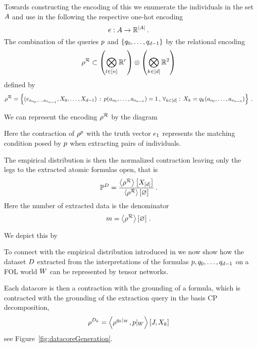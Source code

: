 Towards constructing the encoding of this we enumerate the individuals in the set $A$ and use in the following the respective one-hot encoding 
	\[ e : A \rightarrow \mathbb{R}^{\left|A\right|} \, . \]
The combination of the queries $p$ and $\{q_{0},\ldots,q_{d-1}\}$ by the relational encoding
	\[\rho^{\mathcal{R}} \subset \left(\bigotimes_{l\in[n]}\mathbb{R}^{r}\right) \otimes \left(\bigotimes_{k\in[d]}\mathbb{R}^2\right) \]
defined by
	\[ \rho^{\mathcal{R}} 
	= \left\{ (e_{a_{o_{0}},\ldots,a_{o_{n-1}}}, X_{0},\ldots,X_{d-1}) 
	\, : \, p(a_{o_{0}},\ldots,a_{o_{n-1}}) = 1 \, , \, \forall_{k\in[d]} : \,  X_{k} = q_{k}(a_{o_{0}},\ldots,a_{o_{n-1}}) \right\} \, . \]

%
We can represent the encoding $\rho^{\mathcal{R}}$ by the diagram
\begin{center}
	
\end{center}
Here the contraction of $\rho^{p}$ with the truth vector $e_1$ represents the matching condition posed by $p$ when extracting pairs of individuals.

The empirical distribution is then the normalized contraction leaving only the legs to the extracted atomic formulas open, that is
\begin{align*}
 	\mathbb{P}^{D} 
	= \frac{
	\left\langle \rho^{\mathcal{R}}\right\rangle \left[ X_{[d]} \right]
	}{
	\left\langle \rho^{\mathcal{R}}\right\rangle \left[ \varnothing \right]
	}  \, . 
\end{align*}
Here the number of extracted data is the denominator
	\[ m = \left\langle \rho^{\mathcal{R}}\right\rangle \left[ \varnothing \right] \, .  \]
	
We depict this by
\begin{center}
	
\end{center}





To connect with the empirical distribution introduced in  we now show how the dataset $D$ extracted from the interpretations of the formulas $p,q_{0},\ldots,q_{d-1}$ on a FOL world $W$ can be represented by tensor networks.



Each datacore is then a contraction with the grounding of a formula, which is contracted with the grounding of the extraction query in the basis CP decomposition, 
\begin{align*}
	\rho^{D_{k}} = \left\langle \rho^{{q_{k}}|_{W}},{p}|_{W}\right\rangle \left[ J,X_{k} \right]
\end{align*}
see Figure~\ref{fig:datacoreGeneration}.

